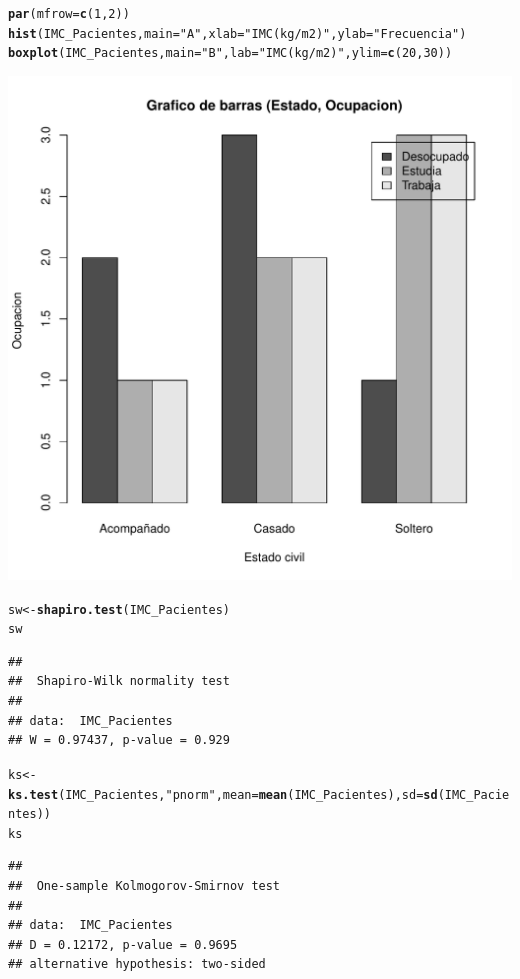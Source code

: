\documentclass{article}\usepackage[]{graphicx}\usepackage[]{color}
\makeatletter
\def\maxwidth{ %
  \ifdim\Gin@nat@width>\linewidth
    \linewidth
  \else
    \Gin@nat@width
  \fi
}
\newcommand{\hlnum}[1]{\textcolor[rgb]{0.686,0.059,0.569}{#1}}%
\newcommand{\hlstr}[1]{\textcolor[rgb]{0.192,0.494,0.8}{#1}}%
\newcommand{\hlstd}[1]{\textcolor[rgb]{0.345,0.345,0.345}{#1}}%
\newcommand{\hlkwb}[1]{\textcolor[rgb]{0.69,0.353,0.396}{#1}}%
\newcommand{\hlkwc}[1]{\textcolor[rgb]{0.333,0.667,0.333}{#1}}%
\newcommand{\hlkwd}[1]{\textcolor[rgb]{0.737,0.353,0.396}{\textbf{#1}}}%
\newenvironment{kframe}{%
 \def\at@end@of@kframe{}%
 \ifinner\ifhmode%
  \def\at@end@of@kframe{\end{minipage}}%
  \begin{minipage}{\columnwidth}%
 \fi\fi%
 \def\FrameCommand##1{\hskip\@totalleftmargin \hskip-\fboxsep
 \colorbox{shadecolor}{##1}\hskip-\fboxsep
     \hskip-\linewidth \hskip-\@totalleftmargin \hskip\columnwidth}%
 \MakeFramed {\advance\hsize-\width
   \@totalleftmargin\z@ \linewidth\hsize
   \@setminipage}}%
 {\par\unskip\endMakeFramed%
 \at@end@of@kframe}
\newenvironment{knitrout}{}{} %
\makeatother
\begin{document}
\begin{knitrout}
\begin{kframe}
\begin{alltt}
\hlkwd{par}\hlstd{(}\hlkwc{mfrow}\hlstd{=}\hlkwd{c}\hlstd{(}\hlnum{1}\hlstd{,}\hlnum{2}\hlstd{))}
\hlkwd{hist}\hlstd{(IMC_Pacientes,}\hlkwc{main}\hlstd{=}\hlstr{"A"}\hlstd{,}\hlkwc{xlab}\hlstd{=}\hlstr{"IMC (kg/m2)"}\hlstd{,}\hlkwc{ylab}\hlstd{=}\hlstr{"Frecuencia"}\hlstd{)}
\hlkwd{boxplot}\hlstd{(IMC_Pacientes,}\hlkwc{main}\hlstd{=}\hlstr{"B"}\hlstd{,} \hlkwc{lab}\hlstd{=}\hlstr{"IMC (kg/m2)"}\hlstd{,}\hlkwc{ylim}\hlstd{=}\hlkwd{c}\hlstd{(}\hlnum{20}\hlstd{,}\hlnum{30}\hlstd{))}
\end{alltt}
\end{kframe}
\includegraphics[width=\maxwidth]{figure/unnamed-chunk-1-2} 
\begin{kframe}\begin{alltt}
\hlstd{sw} \hlkwb{<-} \hlkwd{shapiro.test}\hlstd{(IMC_Pacientes)}
\hlstd{sw}
\end{alltt}
\begin{verbatim}
## 
## 	Shapiro-Wilk normality test
## 
## data:  IMC_Pacientes
## W = 0.97437, p-value = 0.929
\end{verbatim}
\begin{alltt}
\hlstd{ks} \hlkwb{<-} \hlkwd{ks.test}\hlstd{(IMC_Pacientes,}\hlstr{"pnorm"}\hlstd{,}\hlkwc{mean}\hlstd{=}\hlkwd{mean}\hlstd{(IMC_Pacientes),}\hlkwc{sd}\hlstd{=}\hlkwd{sd}\hlstd{(IMC_Pacientes))}
\hlstd{ks}
\end{alltt}
\begin{verbatim}
## 
## 	One-sample Kolmogorov-Smirnov test
## 
## data:  IMC_Pacientes
## D = 0.12172, p-value = 0.9695
## alternative hypothesis: two-sided
\end{verbatim}
\end{kframe}
\end{knitrout}
\end{document}
